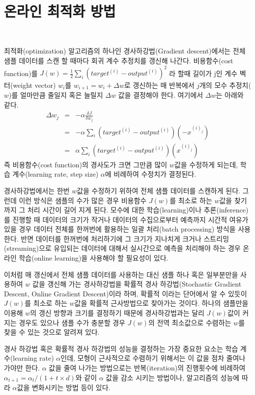 \documentclass[oneside,b5paper,11pt]{book}
\theoremstyle{plain}
\theoremstyle{definition}
\theoremstyle{remark}
\theoremstyle{definition}
\numberwithin{equation}{chapter}
\begin{document}
{}\
\section{온라인 최적화 방법}
{}\

최적화(optimization) 알고리즘의 하나인 경사하강법(Gradient descent)에서는 전체 샘플 데이터를 스캔 할 때마다 회귀 계수 추정치를 갱신해 나간다. 비용함수(cost function)를 $J(w) = \frac{1}{2} \sum_{i}(target^{(i)} - output^{(i)})^{2}$ 라 할때 길이가 j인 계수 벡터(weight vector) $w_i$를 $w_{i+1}=w_{i}+\Delta w$로 갱신하는 매 반복에서 $j$개의 모수 추정치($w$)를 얼마만큼 줄일지 혹은 늘릴지 $\Delta w$ 값을 결정해야 한다. 여기에서 $\Delta w$는 아래와 같다.
\begin{eqnarray}
\Delta w_{j} 	&=& -\alpha \frac{\delta J}{\delta w_{j}} \\
							&=& -\alpha \sum_{i}(target^{(i)} - output^{(i)})(-x^{(i)_{j}}) \\
							&=& \alpha \sum_{i}(target^{(i)} - output^{(i)})(x^{(i)_{j}})
\end{eqnarray}
즉 비용함수(cost function)의 경사도가 크면 그만큼 많이 $w$값을 수정하게 되는데, 학습 계수(learning rate, step size) $\alpha$에 비례하여 수정치가 결정된다.

 경사하강법에서는 한번 $w$값을 수정하기 위하여 전체 샘플 데이터를 스캔하게 된다. 그런데 이런 방식은 샘플의 수가 많은 경우
비용함수 $J(w)$를 최소로 하는 $w$값을 찾기 까지 그 처리 시간이 길어 지게 된다. 모수에 대한 학습(learning)이나 추론(inference)를 진행할 때 데이터의 크기가 작거나 데이터의 수집으로부터 예측까지 시간적 여유가 있을 경우 데이터 전체를 한꺼번에 활용하는 일괄 처리(batch processing) 방식을 사용한다. 반면 데이터를 한꺼번에 처리하기에 그 크기가 지나치게 크거나 스트리밍(streaming)으로 유입되는 데이터에 대해서 실시간으로 예측을 처리해야 하는 경우 온라인 학습(online learning)을 사용해야 할 필요성이 있다.

 이처럼 매 갱신에서 전체 샘플 데이터를 사용하는 대신 샘플 하나 혹은 일부분만을 사용하여 $w$ 값을 갱신해 가는 경사하강법을 확률적 경사 하강법(Stochastic Gradient Descent, Online Gradient Descent)이라 하며, 확률적 이라는 단어에서 알 수 있듯이 $J(w)$를 최소로 하는 $w$값을 확률적 근사방법으로 찾아가는 것이다. 하나의 샘플만을 이용해 $w$의 갱신 방향과 크기를 결정하기 때문에 경사하강법과는 달리 $J(w)$값이 커지는 경우도 있으나 샘플 수가 충분할 경우 $J(w)$의 전역 최소값으로 수렴하는 $w$를 찾을 수 있는 것으로 알려져 있다. \citep{Bottou2010}

 경사 하강법 혹은 확률적 경사 하강법의 성능을 결정하는 가장 중요한 요소는 학습 계수(learning rate) $\alpha$인데, 모형이 근사적으로 수렴하기 위해서는 이 값을 점차 줄여나가야만 한다. $\alpha$ 값을 줄여 나가는 방법으로는 반복(iteration)의 진행횟수에 비례하여 $\alpha_{t+1} = \alpha_{t} / (1 + t \times d )$와 같이 $\alpha$ 값을 감소 시키는 방법이나, 알고리즘의 성능에 따라 $\alpha$값을 변화시키는 방법 등이 있다.
\end{document}
